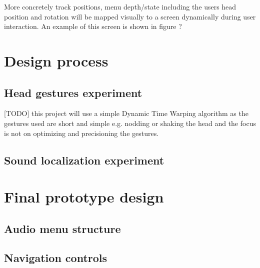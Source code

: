 More concretely track positions, menu depth/state including the users head position and rotation will be mapped visually to a screen dynamically during user interaction. An example of this screen is shown in figure ?

\section{Design process}

\subsection{Head gestures experiment}

[TODO]
this project will use a simple Dynamic Time Warping algorithm \cite{meinard_muller_information_2007} as the gestures used are short and simple e.g. nodding or shaking the head and the focus is not on optimizing and precisioning the gestures.

\subsection{Sound localization experiment}


\section{Final prototype design}

\subsection{Audio menu structure}



\subsection{Navigation controls}








